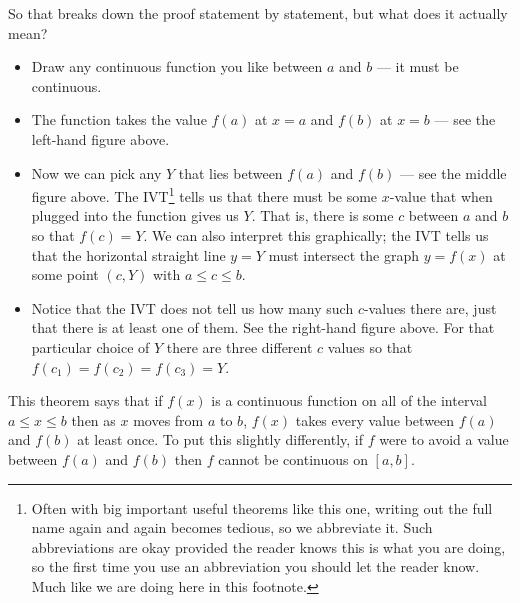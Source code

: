 So that breaks down the proof statement by statement, but what does it actually
mean?
\begin{itemize}
 \item Draw any continuous function you like between $a$ and $b$ --- it must be
continuous.
 \item The function takes the value $f(a)$ at $x=a$ and $f(b)$ at $x=b$ --- see
the left-hand figure above.
 \item Now we can pick any $Y$ that lies between $f(a)$ and $f(b)$ --- see the
middle figure above. The IVT\footnote{Often with big important useful theorems
like this one, writing out the full name again and again becomes tedious, so we
abbreviate it. Such abbreviations are okay provided the reader knows this is
what you are doing, so the first time you use an abbreviation you should let
the reader know. Much like we are doing here in this footnote.} tells us that
there must be some $x$-value that when plugged into the function gives us $Y$.
That is, there is some $c$ between $a$ and $b$ so that $f(c) = Y$. We can also interpret
this graphically; the IVT tells us that the horizontal straight line $y=Y$ must intersect
the graph $y=f(x)$ at some point $(c,Y)$ with $a\le c\le b$.

\item Notice that the IVT does not tell us how many such $c$-values there are,
just that there is at least one of them. See the right-hand figure above. For
that particular choice of $Y$ there are three different $c$ values so that
$f(c_1) = f(c_2) = f(c_3) = Y$.
\end{itemize}
This theorem says that if $f(x)$ is a continuous function on all of the
interval $a \leq x \leq b$ then as $x$ moves from $a$ to $b$, $f(x)$ takes every
value between $f(a)$ and $f(b)$ at least once. To put this slightly
differently, if $f$ were to avoid a value between $f(a)$ and $f(b)$ then $f$
cannot be continuous on $[a,b]$.



